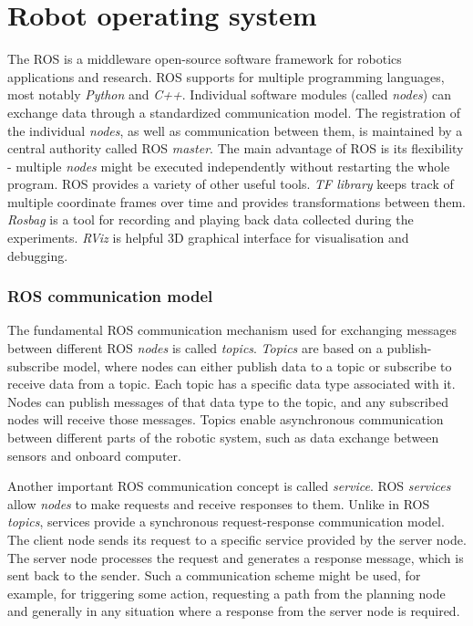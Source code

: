 \section{Robot operating system}
The \ac{ROS} \cite{ROS} is a middleware open-source software framework for robotics applications and research.
\ac{ROS} supports for multiple programming languages, most notably \textit{Python} and \textit{C++}.
Individual software modules (called \textit{nodes}) can exchange data through a standardized communication model.
The registration of the individual \textit{nodes}, as well as communication between them, is maintained by a central authority called \ac{ROS} \textit{master}.
The main advantage of \ac{ROS} is its flexibility - multiple \textit{nodes} might be executed independently without restarting the whole program.
\ac{ROS} provides a variety of other useful tools.
\textit{TF library} keeps track of multiple coordinate frames over time and provides transformations between them.
\textit{Rosbag} is a tool for recording and playing back data collected during the experiments.
\textit{RViz} is helpful 3D graphical interface for visualisation and debugging.

\subsubsection{ROS communication model}
The fundamental \ac{ROS} communication mechanism used for exchanging messages between different \ac{ROS} \textit{nodes} is called \textit{topics}.
\textit{Topics} are based on a publish-subscribe model, where nodes can either publish data to a topic or subscribe to receive data from a topic. 
Each topic has a specific data type associated with it.
Nodes can publish messages of that data type to the topic, and any subscribed nodes will receive those messages.
Topics enable asynchronous communication between different parts of the robotic system, such as data exchange between sensors and onboard computer.

Another important \ac{ROS} communication concept is called \textit{service}.
\ac{ROS} \textit{services} allow \textit{nodes} to make requests and receive responses to them.
Unlike in \ac{ROS} \textit{topics}, services provide a synchronous request-response communication model.
The client node sends its request to a specific service provided by the server node.
The server node processes the request and generates a response message, which is sent back to the sender.
Such a communication scheme might be used, for example, for triggering some action, requesting a path from the planning node and generally in any situation where a response from the server node is required.

